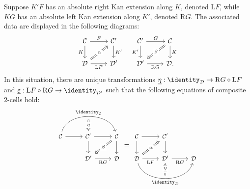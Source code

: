 \begin{theorem}\label{prop:Quillen-adjunction-gen}
	Suppose $K'F$ has an absolute right Kan extension along $K$, denoted
	$\mathrm{L}F$, while $KG$ has an absolute left Kan extension along $K'$,
	denoted $\mathrm{R}G$. The associated data are displayed in the following
	diagrams:
	\[\begin{tikzcd}
		\mathcal{C} \arrow[r, "F"] \arrow[d, "K"'] & \mathcal{C}' \arrow[d, "{K'}"] \\
		\mathcal{D} \arrow[r, "{\mathrm{L}F}"'] \arrow[Rightarrow, ru, "\alpha" description] & \mathcal{D}'
	\end{tikzcd} \quad \begin{tikzcd}
		\mathcal{C}' \arrow[r, "G"] \arrow[d, "{K'}"'] & \mathcal{C} \arrow[d, "K"] \arrow[Rightarrow, ld, "\beta" description] \\
		\mathcal{D}' \arrow[r, "{\mathrm{R}G}"'] & \mathcal{D} .
	\end{tikzcd} \]
	In this situation, there are unique transformations
	$\underline{\eta}: \identity_{\mathcal{D}} \to \mathrm{R}G \circ \mathrm{L}F$
	and
	$\underline{\varepsilon}: \mathrm{L}F \circ \mathrm{R}G \to
	\identity_{\mathcal{D}'}$ such that the following equations of composite
	$2$-cells hold:
	\begin{equation*}\begin{gathered}
		\begin{tikzcd}[every cell/.append style = {font = \small}]
			\mathcal{C} \arrow[r] \arrow[rr, bend left=75, "{\identity_{\mathcal{C}}}", ""' {name=I}] & \mathcal{C}' \arrow[r] \arrow[d] \arrow[Rightarrow, from=I, "\eta" description] & \mathcal{C} \arrow[d] \arrow[Rightarrow, ld, "\beta" description] \\
			& \mathcal{D}' \arrow[r, "{\mathrm{R}G}"'] & \mathcal{D}
		\end{tikzcd} = \begin{tikzcd}[every cell/.append style = {font = \small}]
			\mathcal{C} \arrow[r] \arrow[d] & \mathcal{C}' \arrow[d] & \\
			\mathcal{D} \arrow[r, "{\mathrm{L}F}"'] \arrow[rr, bend right=75, "{\identity_{\mathcal{D}}}"', "" {name=I}] \arrow[Rightarrow, ru, "\alpha" description] & \mathcal{D}' \arrow[r, "{\mathrm{R}G}"'] \arrow[Rightarrow, from=I, "\underline{\eta}" description] & \mathcal{D}

\end{tikzcd}
\end{gathered}
\end{equation*}
\end{theorem}

